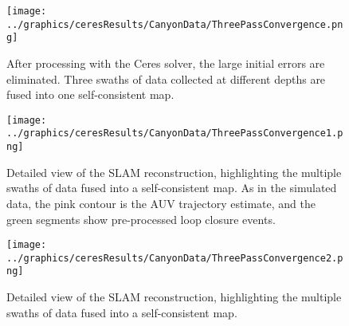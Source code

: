  \begin{figure}[htbp]
   \centering
   \texttt{[image: ../graphics/ceresResults/CanyonData/ThreePassConvergence.png]} %
   \caption{After processing with the Ceres solver, the large initial errors are eliminated. Three swaths of data collected at different depths are fused into one self-consistent map. }
   \label{fig:RealDataSolution1}
\end{figure}

 \begin{figure}[htbp]
   \centering
   \texttt{[image: ../graphics/ceresResults/CanyonData/ThreePassConvergence1.png]} %
   \caption{Detailed view of the SLAM reconstruction, highlighting the multiple swaths of data fused into a self-consistent map. As in the simulated data, the pink contour is the AUV trajectory estimate, and the green segments show pre-processed loop closure events. }
   \label{fig:RealDataSolution1}
\end{figure}

 \begin{figure}[htbp]
   \centering
   \texttt{[image: ../graphics/ceresResults/CanyonData/ThreePassConvergence2.png]} %
   \caption{Detailed view of the SLAM reconstruction, highlighting the multiple swaths of data fused into a self-consistent map. }
   \label{fig:RealDataSolution2}
\end{figure}